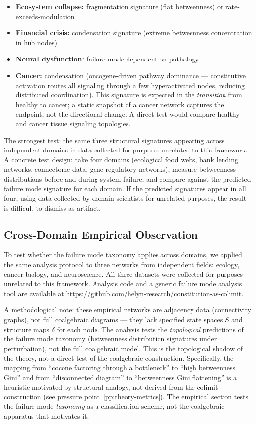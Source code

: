\documentclass[12pt,a4paper]{article}
\begin{document}
\begin{itemize}
  \item \textbf{Ecosystem collapse:} fragmentation signature (flat betweenness) or rate-exceeds-modulation
  \item \textbf{Financial crisis:} condensation signature (extreme betweenness concentration in hub nodes)
  \item \textbf{Neural dysfunction:} failure mode dependent on pathology
  \item \textbf{Cancer:} condensation (oncogene-driven pathway dominance --- constitutive activation routes all signaling through a few hyperactivated nodes, reducing distributed coordination). This signature is expected in the \emph{transition} from healthy to cancer; a static snapshot of a cancer network captures the endpoint, not the directional change. A direct test would compare healthy and cancer tissue signaling topologies.
\end{itemize}

The strongest test: the same three structural signatures appearing across independent domains in data collected for purposes unrelated to this framework. A concrete test design: take four domains (ecological food webs, bank lending networks, connectome data, gene regulatory networks), measure betweenness distributions before and during system failure, and compare against the predicted failure mode signature for each domain. If the predicted signatures appear in all four, using data collected by domain scientists for unrelated purposes, the result is difficult to dismiss as artifact.

\subsection{Cross-Domain Empirical Observation}
\label{sec:cross-domain}

To test whether the failure mode taxonomy applies across domains, we applied the same analysis protocol to three networks from independent fields: ecology, cancer biology, and neuroscience. All three datasets were collected for purposes unrelated to this framework. Analysis code and a generic failure mode analysis tool are available at \url{https://github.com/helyn-research/constitution-as-colimit}.

A methodological note: these empirical networks are adjacency data (connectivity graphs), not full coalgebraic diagrams --- they lack specified state spaces $S$ and structure maps $\delta$ for each node. The analysis tests the \emph{topological} predictions of the failure mode taxonomy (betweenness distribution signatures under perturbation), not the full coalgebraic model. This is the topological shadow of the theory, not a direct test of the coalgebraic construction. Specifically, the mapping from ``cocone factoring through a bottleneck'' to ``high betweenness Gini'' and from ``disconnected diagram'' to ``betweenness Gini flattening'' is a heuristic motivated by structural analogy, not derived from the colimit construction (see pressure point~\ref{pp:theory-metrics}). The empirical section tests the failure mode \emph{taxonomy} as a classification scheme, not the coalgebraic apparatus that motivates it.
\end{document}
